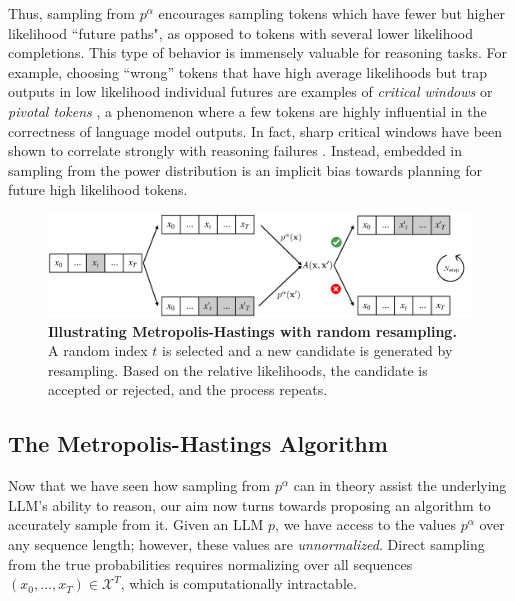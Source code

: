 \documentclass{article}
\begin{document}
Thus, sampling from $p^{\alpha}$ encourages sampling tokens which have fewer but higher likelihood ``future paths", as opposed to tokens with several lower likelihood completions. This type of behavior is immensely valuable for reasoning tasks. For example, choosing ``wrong'' tokens that have high average likelihoods but trap outputs in low likelihood individual futures are examples of \textit{critical windows} or \textit{pivotal tokens} \citep{li2025blinkofaneyetheory, abdin2024phi4}, a phenomenon where a few tokens are highly influential in the correctness of language model outputs. In fact, sharp critical windows have been shown to correlate strongly with reasoning failures \citep{li2025blinkofaneyetheory}. Instead, embedded in sampling from the power distribution is an implicit bias towards planning for future high likelihood tokens.

\begin{figure}[t]
  \centering
  \includegraphics[width=\linewidth]{mcmc.pdf}
  \captionsetup{font=small}
  \caption{\textbf{Illustrating Metropolis-Hastings with random resampling.} A random index $t$ is selected and a new candidate is generated by resampling. Based on the relative likelihoods, the candidate is accepted or rejected, and the process repeats.}
  \label{fig:step}
\end{figure}






\subsection{The Metropolis-Hastings Algorithm}\label{subsec:mh}
Now that we have seen how sampling from $p^{\alpha}$ can in theory assist the underlying LLM's ability to reason, our aim now turns towards proposing an algorithm to accurately sample from it. Given an LLM $p$, we have access to the values $p^{\alpha}$ over any sequence length; however, these values are \textit{unnormalized}. Direct sampling from the true probabilities requires normalizing over all sequences $(x_0, \dots, x_T) \in \mathcal{X}^T$, which is computationally intractable. 
\end{document}
